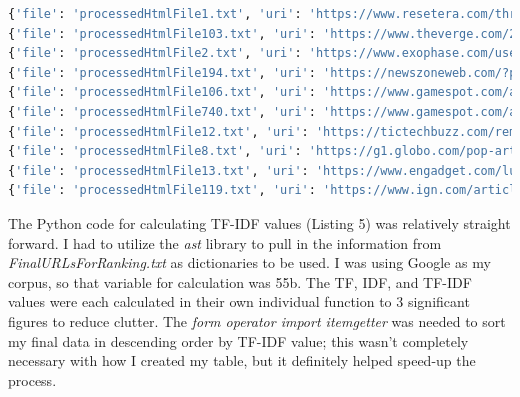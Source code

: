 \documentclass[12pt]{article}
\begin{document}
\begin{lstlisting}[language=Python, caption={Final set of 10 URIs chsoen for TD-IDF calculations}, label=lst:copy]
{'file': 'processedHtmlFile1.txt', 'uri': 'https://www.resetera.com/threads/xbox-brasil-dismisses-new-host-after-she-was-the-victim-of-death-and-rape-threats.307873/', 'words': 412, 'occurences': 8}
{'file': 'processedHtmlFile103.txt', 'uri': 'https://www.theverge.com/2020/10/15/21517293/xbox-series-x-s-dashboard-ui-october-update-release?_lrsc=f9510bb1-a7e2-43c8-9e49-761f32bbdc52', 'words': 256, 'occurences': 8}
{'file': 'processedHtmlFile2.txt', 'uri': 'https://www.exophase.com/user/toniazzo/?1602892894', 'words': 48, 'occurences': 1}
{'file': 'processedHtmlFile194.txt', 'uri': 'https://newszoneweb.com/?p=5809','words': 1247, 'occurences': 1}
{'file': 'processedHtmlFile106.txt', 'uri': 'https://www.gamespot.com/articles/future-bethesda-titles-dont-need-to-be-on-ps5-says-xboxs-phil-spencer/1100-6483415/', 'words': 407, 'occurences': 4}
{'file': 'processedHtmlFile740.txt', 'uri': 'https://www.gamespot.com/articles/marvels-avengers-ps5-and-xbox-series-x-s-versions-delayed-to-2021/1100-6483398/', 'words': 323, 'occurences': 4}
{'file': 'processedHtmlFile12.txt', 'uri': 'https://tictechbuzz.com/remembering-the-classics-the-xbox-podcast-featuring-tim-schafer/', 'words': 481, 'occurences': 11}
{'file': 'processedHtmlFile8.txt', 'uri': 'https://g1.globo.com/pop-arte/games/noticia/2020/10/16/microsoft-demite-apresentadora-do-xbox-br-que-sofreu-ameacas.ghtml?utm_source=twitter&utm_medium=social&utm_campaign=g1', 'words': 276, 'occurences': 7}
{'file': 'processedHtmlFile13.txt', 'uri': 'https://www.engadget.com/lucasarts-double-fine-remasters-game-pass-235238100.html', 'words': 225, 'occurences': 4}
{'file': 'processedHtmlFile119.txt', 'uri': 'https://www.ign.com/articles/phil-spencer-xbox-bethesda-ps5?utm_source=dlvr.it&utm_medium=twitter', 'words': 587, 'occurences': 11}
\end{lstlisting}

The Python code for calculating TF-IDF values (Listing 5) was relatively straight forward. I had to utilize the \emph{ast} library to pull in the information from \emph{FinalURLsForRanking.txt} as dictionaries to be used. I was using Google as my corpus, so that variable for calculation was 55b. The TF, IDF, and TF-IDF values were each calculated in their own individual function to 3 significant figures to reduce clutter. The \emph{form operator import itemgetter} was needed to sort my final data in descending order by TF-IDF value; this wasn't completely necessary with how I created my table, but it definitely helped speed-up the process.
\end{document}
